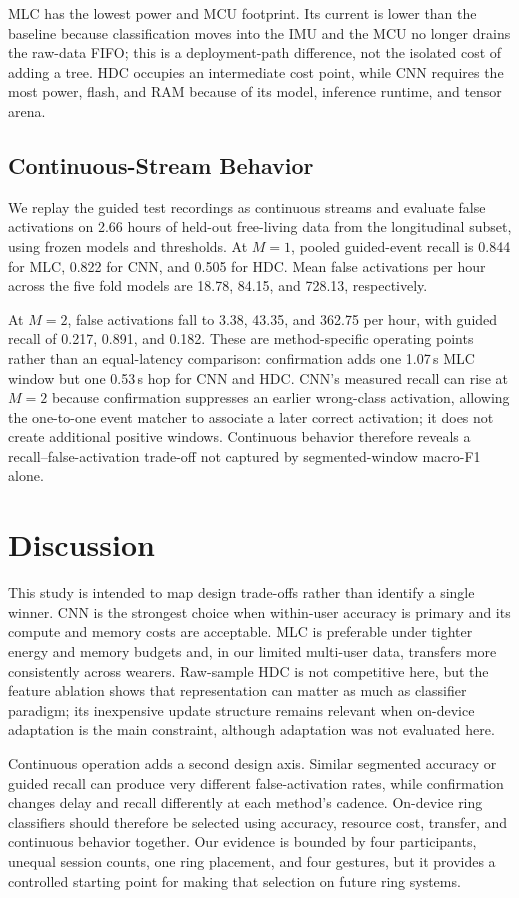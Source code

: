 MLC has the lowest power and MCU footprint. Its current is lower than the
baseline because classification moves into the IMU and the MCU no longer
drains the raw-data FIFO; this is a deployment-path difference, not the
isolated cost of adding a tree. HDC occupies an intermediate cost point, while
CNN requires the most power, flash, and RAM because of its model, inference
runtime, and tensor arena.

\subsection{Continuous-Stream Behavior}

We replay the guided test recordings as continuous streams and evaluate false
activations on 2.66 hours of held-out free-living data from the longitudinal
subset, using frozen models and thresholds. At $M=1$, pooled guided-event
recall is 0.844 for MLC, 0.822 for CNN, and 0.505 for HDC. Mean false
activations per hour across the five fold models are 18.78, 84.15, and 728.13,
respectively.

At $M=2$, false activations fall to 3.38, 43.35, and 362.75 per hour, with
guided recall of 0.217, 0.891, and 0.182. These are method-specific operating
points rather than an equal-latency comparison: confirmation adds one 1.07\,s
MLC window but one 0.53\,s hop for CNN and HDC. CNN's measured recall can rise
at $M=2$ because confirmation suppresses an earlier wrong-class activation,
allowing the one-to-one event matcher to associate a later correct activation;
it does not create additional positive windows. Continuous behavior therefore
reveals a recall--false-activation trade-off not captured by segmented-window
macro-F1 alone.

\section{Discussion}

This study is intended to map design trade-offs rather than identify a single
winner. CNN is the strongest choice when within-user accuracy is primary and
its compute and memory costs are acceptable. MLC is preferable under tighter
energy and memory budgets and, in our limited multi-user data, transfers more
consistently across wearers. Raw-sample HDC is not competitive here, but the
feature ablation shows that representation can matter as much as classifier
paradigm; its inexpensive update structure remains relevant when on-device
adaptation is the main constraint, although adaptation was not evaluated here.

Continuous operation adds a second design axis. Similar segmented accuracy or
guided recall can produce very different false-activation rates, while
confirmation changes delay and recall differently at each method's cadence.
On-device ring classifiers should therefore be selected using accuracy,
resource cost, transfer, and continuous behavior together. Our evidence is
bounded by four participants, unequal session counts, one ring placement, and
four gestures, but it provides a controlled starting point for making that
selection on future ring systems.
